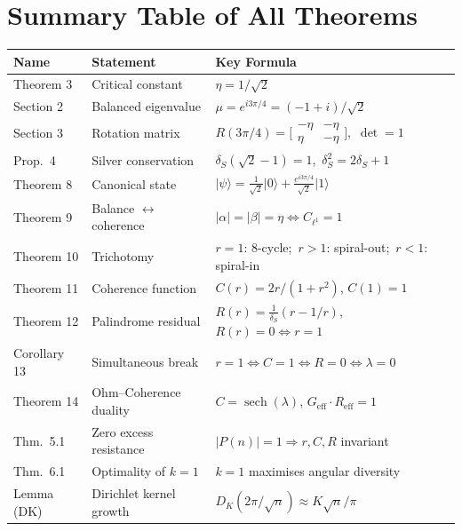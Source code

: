 \documentclass[12pt,a4paper]{article}
\theoremstyle{plain}
\theoremstyle{definition}
\theoremstyle{remark}
\newcommand{\ket}[1]{\lvert #1 \rangle}
\newcommand{\abs}[1]{\lvert #1 \rvert}
\newcommand{\dS}{\delta_S}        %
\newcommand{\Geff}{G_{\mathrm{eff}}}
\newcommand{\Reff}{R_{\mathrm{eff}}}
\begin{document}
\section{Summary Table of All Theorems}
\label{sec:summary}

\begin{center}
\renewcommand{\arraystretch}{1.35}
\begin{tabular}{@{}lll@{}}
\toprule
\textbf{Name} & \textbf{Statement} & \textbf{Key Formula}\\
\midrule
Theorem 3
  & Critical constant
  & $\eta = 1/\sqrt{2}$\\
Section 2
  & Balanced eigenvalue
  & $\mu = e^{i3\pi/4} = (-1+i)/\sqrt{2}$\\
Section 3
  & Rotation matrix
  & $R(3\pi/4) = \bigl[\begin{smallmatrix}-\eta & -\eta \\ \eta & -\eta\end{smallmatrix}\bigr]$,\ $\det=1$\\
Prop.\ 4
  & Silver conservation
  & $\dS(\sqrt{2}-1)=1$,\ $\dS^2=2\dS+1$\\
Theorem 8
  & Canonical state
  & $\ket\psi = \frac{1}{\sqrt2}\ket0 + \frac{e^{i3\pi/4}}{\sqrt2}\ket1$\\
Theorem 9
  & Balance $\leftrightarrow$ coherence
  & $\abs\alpha=\abs\beta=\eta \Leftrightarrow C_{\ell^1}=1$\\
Theorem 10
  & Trichotomy
  & $r=1$: 8-cycle;\ $r>1$: spiral-out;\ $r<1$: spiral-in\\
Theorem 11
  & Coherence function
  & $C(r)=2r/(1+r^2)$, $C(1)=1$\\
Theorem 12
  & Palindrome residual
  & $R(r)=\frac{1}{\dS}(r-1/r)$, $R(r)=0\Leftrightarrow r=1$\\
Corollary 13
  & Simultaneous break
  & $r=1 \Leftrightarrow C=1 \Leftrightarrow R=0 \Leftrightarrow \lambda=0$\\
Theorem 14
  & Ohm--Coherence duality
  & $C=\operatorname{sech}(\lambda)$, $\Geff\cdot\Reff=1$\\
Thm.\ 5.1
  & Zero excess resistance
  & $\abs{P(n)}=1 \Rightarrow r,C,R$ invariant\\
Thm.\ 6.1
  & Optimality of $k=1$
  & $k=1$ maximises angular diversity\\
Lemma (DK)
  & Dirichlet kernel growth
  & $D_K(2\pi/\sqrt n)\approx K\sqrt n/\pi$\\

\end{tabular}
\end{center}
\end{document}
